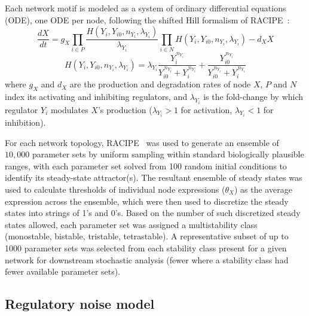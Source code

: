 \documentclass[11pt]{article}
\begin{document}
Each network motif is modeled as a system of ordinary differential equations (ODE), one ODE per node, following the shifted Hill formalism of RACIPE~\cite{Huang2017}:
\begin{equation}
\frac{dX}{dt} = g_X \prod_{i \in P} \frac{H(Y_i, Y_{i0}, n_{Y_i}, \lambda_{Y_i})}{\lambda_{Y_i}} \prod_{i \in N} H(Y_i, Y_{i0}, n_{Y_i}, \lambda_{Y_i}) - d_X X
\label{eq:odeM}
\end{equation}
\begin{equation}
H(Y_i, Y_{i0}, n_{Y_i}, \lambda_{Y_i}) = \lambda_{Y_i} \frac{Y_i^{\,n_{Y_i}}}{Y_{i0}^{\,n_{Y_i}} + Y_i^{\,n_{Y_i}}} + \frac{Y_{i0}^{\,n_{Y_i}}}{Y_{i0}^{\,n_{Y_i}} + Y_i^{\,n_{Y_i}}}
\label{eq:hillM}
\end{equation}
where $g_X$ and $d_X$ are the production and degradation rates of node $X$, $P$ and $N$ index its activating and inhibiting regulators, and $\lambda_{Y_i}$ is the fold-change by which regulator $Y_i$ modulates $X$'s production ($\lambda_{Y_i} > 1$ for activation, $\lambda_{Y_i} < 1$ for inhibition).

For each network topology, RACIPE~\cite{Huang2017} was used to generate an ensemble of $10{,}000$ parameter sets by uniform sampling within standard biologically plausible ranges, with each parameter set solved from 100 random initial conditions to identify its steady-state attractor(s). The resultant ensemble of steady states was used to calculate thresholds of individual node expressions ($\theta_X$) as the average expression across the ensemble, which were then used to discretize the steady states into strings of 1's and 0's. Based on the number of such discretized steady states allowed, each parameter set was assigned a multistability class (monostable, bistable, tristable, tetrastable). A representative subset of up to 1000 parameter sets was selected from each stability class present for a given network for downstream stochastic analysis (fewer where a stability class had fewer available parameter sets).

\subsection{Regulatory noise model} \label{sec:noise}
\end{document}
